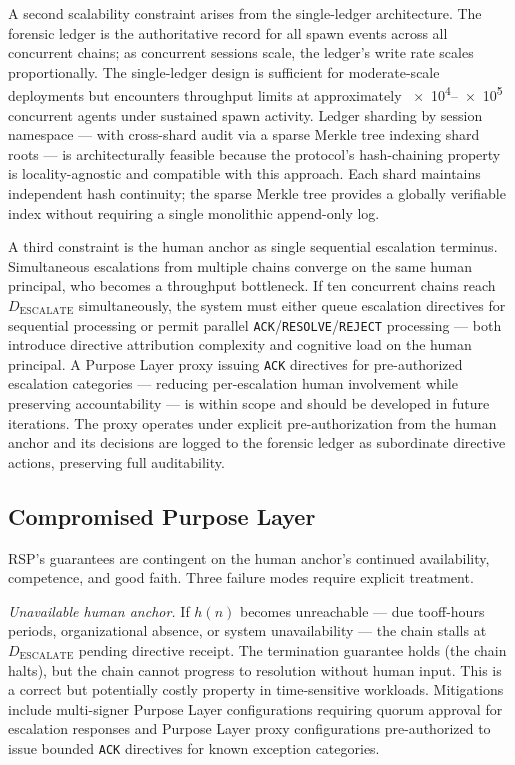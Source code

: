 A second scalability constraint arises from the single-ledger architecture. The forensic ledger is the authoritative record for all spawn events across all concurrent chains; as concurrent sessions scale, the ledger's write rate scales proportionally. The single-ledger design is sufficient for moderate-scale deployments but encounters throughput limits at approximately \numrange{e4}{e5} concurrent agents under sustained spawn activity. Ledger sharding by session namespace — with cross-shard audit via a sparse Merkle tree indexing shard roots — is architecturally feasible because the protocol's hash-chaining property is locality-agnostic and compatible with this approach. Each shard maintains independent hash continuity; the sparse Merkle tree provides a globally verifiable index without requiring a single monolithic append-only log.

A third constraint is the human anchor as single sequential escalation terminus. Simultaneous escalations from multiple chains converge on the same human principal, who becomes a throughput bottleneck. If ten concurrent chains reach $D_{\text{ESCALATE}}$ simultaneously, the system must either queue escalation directives for sequential processing or permit parallel \texttt{ACK}/\texttt{RESOLVE}/\texttt{REJECT} processing — both introduce directive attribution complexity and cognitive load on the human principal. A Purpose Layer proxy issuing \texttt{ACK} directives for pre-authorized escalation categories — reducing per-escalation human involvement while preserving accountability — is within scope and should be developed in future iterations. The proxy operates under explicit pre-authorization from the human anchor and its decisions are logged to the forensic ledger as subordinate directive actions, preserving full auditability.

\subsection{Compromised Purpose Layer}
\label{sec:rs-purpose-compromise}

RSP's guarantees are contingent on the human anchor's continued availability, competence, and good faith. Three failure modes require explicit treatment.

\textit{Unavailable human anchor.} If $h(n)$ becomes unreachable — due tooff-hours periods, organizational absence, or system unavailability — the chain stalls at $D_{\text{ESCALATE}}$ pending directive receipt. The termination guarantee holds (the chain halts), but the chain cannot progress to resolution without human input. This is a correct but potentially costly property in time-sensitive workloads. Mitigations include multi-signer Purpose Layer configurations requiring quorum approval for escalation responses and Purpose Layer proxy configurations pre-authorized to issue bounded \texttt{ACK} directives for known exception categories.

